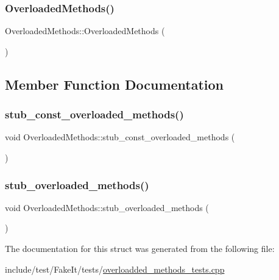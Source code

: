 \subsubsection{\texorpdfstring{OverloadedMethods()}{OverloadedMethods()}}
{\footnotesize\ttfamily Overloaded\+Methods\+::\+Overloaded\+Methods (\begin{DoxyParamCaption}{ }\end{DoxyParamCaption})\hspace{0.3cm}{\ttfamily [inline]}}



\subsection{Member Function Documentation}
\mbox{\label{structOverloadedMethods_af6ed7219a721f9e07a5eef39f921e617}} 
\subsubsection{\texorpdfstring{stub\_const\_overloaded\_methods()}{stub\_const\_overloaded\_methods()}}
{\footnotesize\ttfamily void Overloaded\+Methods\+::stub\+\_\+const\+\_\+overloaded\+\_\+methods (\begin{DoxyParamCaption}{ }\end{DoxyParamCaption})\hspace{0.3cm}{\ttfamily [inline]}}

\mbox{\label{structOverloadedMethods_aee971c77d0fc0a18fc78e2881c2c6445}} 
\subsubsection{\texorpdfstring{stub\_overloaded\_methods()}{stub\_overloaded\_methods()}}
{\footnotesize\ttfamily void Overloaded\+Methods\+::stub\+\_\+overloaded\+\_\+methods (\begin{DoxyParamCaption}{ }\end{DoxyParamCaption})\hspace{0.3cm}{\ttfamily [inline]}}



The documentation for this struct was generated from the following file\+:\begin{DoxyCompactItemize}
\item 
include/test/\+Fake\+It/tests/\mbox{\hyperlink{overloadded__methods__tests_8cpp}{overloadded\+\_\+methods\+\_\+tests.\+cpp}}\end{DoxyCompactItemize}
